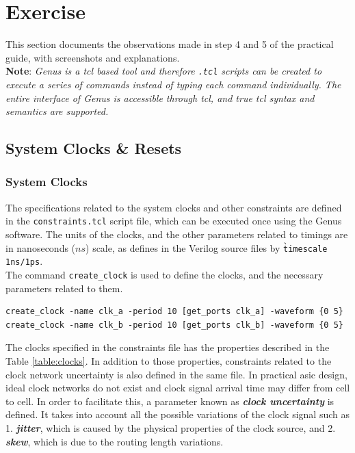 \documentclass[a4paper,11pt]{article}%
\begin{document}
\section{Exercise}
This section documents the observations made in step 4 and 5 of the practical guide, with screenshots and explanations.\\

\textbf{Note}: \textit{Genus is a \ac{tcl} based tool and therefore {\tt .tcl} scripts can be created to execute a series of commands instead of typing each command individually. The entire interface of Genus is accessible through \ac{tcl}, and true \ac{tcl} syntax and semantics are supported.}

\subsection{System Clocks \& Resets}

\subsubsection{System Clocks}

The specifications related to the system clocks and other constraints are defined in the {\tt constraints.tcl} script file, which can be executed once using the Genus software. The units of the clocks, and the other parameters related to timings are in nanoseconds ($ns$) scale, as defines in the Verilog source files by {\tt \`timescale 1ns/1ps}.\\

The command {\tt create\_clock}\cite{genus_command_ref_2019} is used to define the clocks, and the necessary parameters related to them. 

\begin{Verbatim}[frame=single]
create_clock -name clk_a -period 10 [get_ports clk_a] -waveform {0 5}
create_clock -name clk_b -period 10 [get_ports clk_b] -waveform {0 5}
\end{Verbatim}

The clocks specified in the constraints file has the properties described in the Table \ref{table:clocks}. In addition to those properties, constraints related to the clock network uncertainty is also defined in the same file. In practical \ac{asic} design, ideal clock networks do not exist and clock signal arrival time may differ from cell to cell. In order to facilitate this, a parameter known as \textit{\textbf{clock uncertainty}} is defined. It takes into account all the possible variations of the clock signal such as 1. \textit{\textbf{jitter}}, which is caused by the physical properties of the clock source, and 2. \textit{\textbf{skew}}, which is due to the routing length variations.\\
\end{document}
